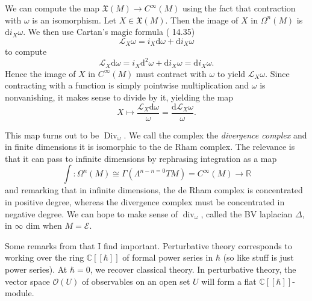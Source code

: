 We can compute the map $\mathfrak{X} (M)\to C^\infty (M)$ using the fact that contraction with $\omega $ is an isomorphism. Let $X\in \mathfrak{X} (M)$. Then the image of $X$ in $\Omega ^n(M)$ is $\mathrm{d} i_X\omega $. We then use Cartan's magic formula (\cite{lee} 14.35)
\[
	\mathcal{L} _X\omega =i_X\mathrm{d} \omega +\mathrm{d} i_X\omega 
\]
to compute
\[
	\mathcal{L} _X\mathrm{d} \omega =i_X\mathrm{d} ^2\omega +\mathrm{d} i_X\omega =\mathrm{d} i_X\omega 
.\]
Hence the image of $X$ in $C^\infty (M)$ must contract with $\omega $ to yield $\mathcal{L} _X\omega $. Since contracting with a function is simply pointwise multiplication and $\omega $ is nonvanishing, it makes sense to divide by it, yielding the map
\[
	X\mapsto \frac{\mathcal{L} _X\mathrm{d}\omega }{\omega }=\frac{\mathrm{d} \mathcal{L} _X\omega }{\omega }  
.\]

This map turns out to be $\operatorname{Div} _\omega $. We call the complex the \emph{divergence complex} and in finite dimensions it is isomorphic to the de Rham complex. The relevance is that it can pass to infinite dimensions by rephrasing integration as a map
\[
	\int : \Omega ^n(M) \cong \Gamma (\Lambda ^{n-n=0} TM)=C^\infty (M)\longrightarrow \mathbb{R} 
\]
and remarking that in infinite dimensions, the de Rham complex is concentrated in positive degree, whereas the divergence complex must be concentrated in negative degree. We can hope to make sense of $\operatorname{div} _\omega $, called the BV laplacian $\Delta $, in $\infty $ dim when $M=\mathcal{E} $.

Some remarks from \cite{cg1} that I find important. Perturbative theory corresponds to working over the ring $\mathbb{C} [[\hbar ]]$ of formal power series in $\hbar $ (so like stuff is just power series). At $\hbar =0$, we recover classical theory. In perturbative theory, the vector space $\mathcal{O} (U)$ of observables on an open set $U$ will form a flat $\mathbb{C} [[\hbar ]]$-module.

